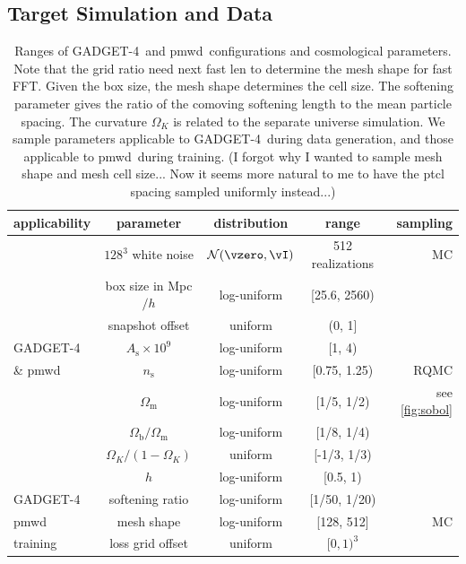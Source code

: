 \documentclass[modern, trackchanges, dvipsnames]{aastex631}
\newcommand{\pmwd}{{\usefont{T1}{nova}{m}{sl}pmwd}}
\newcommand{\GADGET}{{{\fontsize{10pt}{12pt}\selectfont GADGET}-4}}
\newcommand{\As}{A_\mathrm{s}}
\newcommand{\ns}{n_\mathrm{s}}
\newcommand{\Omegam}{\Omega_\mathrm{m}}
\newcommand{\Omegab}{\Omega_\mathrm{b}}
\newcommand{\OmegaK}{\Omega_K}
\newcommand{\YL}[1]{\textcolor{Bittersweet}{#1}}
\begin{document}
\subsection{Target Simulation and Data}

\begin{table}
  \centering
  \caption{Ranges of \GADGET\ and \pmwd\ configurations and cosmological
  parameters.
  Note that the grid ratio need next fast len to determine the mesh shape
  for fast FFT.
  Given the box size, the mesh shape determines the cell size.
  The softening parameter gives the ratio of the comoving softening length
  to the mean particle spacing.
  The curvature $\OmegaK$ is related to the separate universe simulation.
  We sample parameters applicable to \GADGET\ during data generation, and
  those applicable to \pmwd\ during training.
  \YL{(I forgot why I wanted to sample mesh shape and mesh cell size...
  Now it seems more natural to me to have the ptcl spacing sampled
  uniformly instead...)}
  }
  \label{tab:param}
  \begin{tabular}{lcccr}
  \toprule
  applicability & parameter & distribution & range & sampling \\
  \midrule
  & $128^3$ white noise & $\mathcal{N}(\vzero, \vI)$ & 512 realizations & MC \\
  \cmidrule(lr){2-5}
  & box size in Mpc$/h$ & \YL{log-uniform} & [25.6, 2560) \\
  \cmidrule(lr){2-4}
  & snapshot offset & uniform & (0, 1] \\
  \cmidrule(lr){2-4}
  \GADGET\ & $\As \times 10^9$ & log-uniform & [1, 4) \\
  \cmidrule(lr){2-4}
  \& \pmwd\ & $\ns$ & log-uniform & [0.75, 1.25) & RQMC \\
  \cmidrule(lr){2-4}
  & $\Omegam$ & log-uniform & [1/5, 1/2) & see \autoref{fig:sobol} \\
  \cmidrule(lr){2-4}
  & $\Omegab / \Omegam$ & log-uniform & [1/8, 1/4) \\
  \cmidrule(lr){2-4}
  & $\OmegaK / (1 - \OmegaK)$ & uniform & [-1/3, 1/3) \\
  \cmidrule(lr){2-4}
  & $h$ & log-uniform & [0.5, 1) \\
  \cmidrule(lr){1-4}
  \GADGET\ & softening ratio & log-uniform & [1/50, 1/20) \\
  \cmidrule(lr){1-5}
  \pmwd\ & mesh shape & log-uniform & [128, 512] & MC \\
  \cmidrule(lr){2-4}
  \cmidrule(lr){1-4}
  training & loss grid offset & uniform & $[0, 1)^3$ \\
  \bottomrule
  \end{tabular}
  \end{table}
\end{document}
